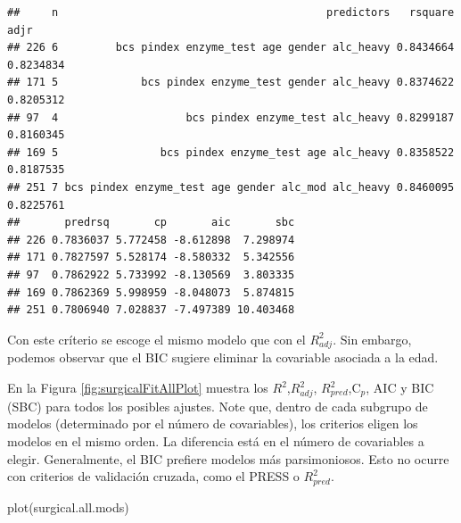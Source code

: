 \documentclass[
]{article}
\newenvironment{Shaded}{\begin{snugshade}}{\end{snugshade}}
\newcommand{\AttributeTok}[1]{\textcolor[rgb]{0.77,0.63,0.00}{#1}}
\newcommand{\DecValTok}[1]{\textcolor[rgb]{0.00,0.00,0.81}{#1}}
\newcommand{\FunctionTok}[1]{\textcolor[rgb]{0.00,0.00,0.00}{#1}}
\newcommand{\NormalTok}[1]{#1}
\newcommand{\OtherTok}[1]{\textcolor[rgb]{0.56,0.35,0.01}{#1}}
\newcommand{\SpecialCharTok}[1]{\textcolor[rgb]{0.00,0.00,0.00}{#1}}
\begin{document}
\begin{Shaded}
\end{Shaded}

\begin{verbatim}
##     n                                          predictors   rsquare      adjr
## 226 6         bcs pindex enzyme_test age gender alc_heavy 0.8434664 0.8234834
## 171 5             bcs pindex enzyme_test gender alc_heavy 0.8374622 0.8205312
## 97  4                    bcs pindex enzyme_test alc_heavy 0.8299187 0.8160345
## 169 5                bcs pindex enzyme_test age alc_heavy 0.8358522 0.8187535
## 251 7 bcs pindex enzyme_test age gender alc_mod alc_heavy 0.8460095 0.8225761
##       predrsq       cp       aic       sbc
## 226 0.7836037 5.772458 -8.612898  7.298974
## 171 0.7827597 5.528174 -8.580332  5.342556
## 97  0.7862922 5.733992 -8.130569  3.803335
## 169 0.7862369 5.998959 -8.048073  5.874815
## 251 0.7806940 7.028837 -7.497389 10.403468
\end{verbatim}

Con este críterio se escoge el mismo modelo que con el \(R^{2}_{adj}\). Sin embargo, podemos observar que el BIC sugiere eliminar la covariable asociada a la edad.

En la Figura \ref{fig:surgicalFitAllPlot} muestra los \(R^{2}\),\(R^{2}_{adj}\), \(R^{2}_{pred}\),C\(_p\), AIC y BIC (SBC) para todos los posibles ajustes. Note que, dentro de cada subgrupo de modelos (determinado por el número de covariables), los criterios eligen los modelos en el mismo orden. La diferencia está en el número de covariables a elegir. Generalmente, el BIC prefiere modelos más parsimoniosos. Esto no ocurre con criterios de validación cruzada, como el PRESS o \(R^{2}_{pred}\).

\begin{Shaded}
\begin{Highlighting}[]
\FunctionTok{plot}\NormalTok{(surgical.all.mods)}
\end{Highlighting}
\end{Shaded}
\end{document}

